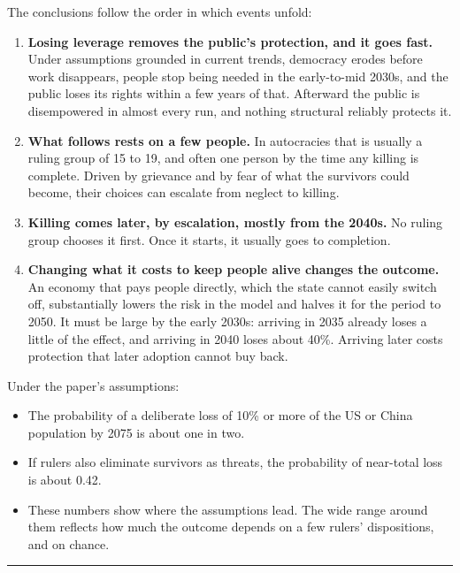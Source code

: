 \documentclass[
  10pt,
]{article}
\providecommand{\tightlist}{%
  \setlength{\itemsep}{0pt}\setlength{\parskip}{0pt}}
\begin{document}
The conclusions follow the order in which events unfold:

\begin{enumerate}
\def\labelenumi{\arabic{enumi}.}
\tightlist
\item
  \textbf{Losing leverage removes the public's protection, and it goes fast.} Under assumptions
  grounded in current trends, democracy erodes before work disappears, people stop being needed in
  the early-to-mid 2030s, and the public loses its rights within a few years of that. Afterward the
  public is disempowered in almost every run, and nothing structural reliably protects it.
\item
  \textbf{What follows rests on a few people.} In autocracies that is usually a ruling group of 15
  to 19, and often one person by the time any killing is complete. Driven by grievance and by fear
  of what the survivors could become, their choices can escalate from neglect to killing.
\item
  \textbf{Killing comes later, by escalation, mostly from the 2040s.} No ruling group chooses it
  first. Once it starts, it usually goes to completion.
\item
  \textbf{Changing what it costs to keep people alive changes the outcome.} An economy that pays
  people directly, which the state cannot easily switch off, substantially lowers the risk in the
  model and halves it for the period to 2050. It must be large by the early 2030s: arriving in 2035
  already loses a little of the effect, and arriving in 2040 loses about 40\%. Arriving later costs
  protection that later adoption cannot buy back.
\end{enumerate}

Under the paper's assumptions:

\begin{itemize}
\tightlist
\item
  The probability of a deliberate loss of 10\% or more of the US or China population by 2075 is
  about one in two.
\item
  If rulers also eliminate survivors as threats, the probability of near-total loss is about 0.42.
\item
  These numbers show where the assumptions lead. The wide range around them reflects how much the
  outcome depends on a few rulers' dispositions, and on chance.
\end{itemize}

\begin{center}\rule{0.5\linewidth}{0.5pt}\end{center}
\end{document}
